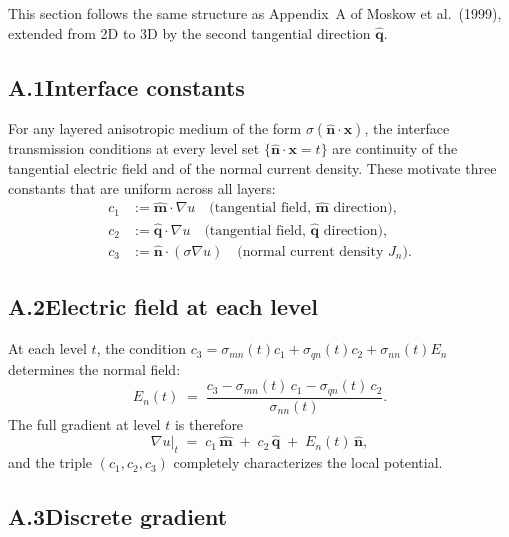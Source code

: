 \documentclass[11pt]{article}
\newcommand{\nn}{\hat{\bm{n}}}
\newcommand{\mm}{\hat{\bm{m}}}
\newcommand{\qq}{\hat{\bm{q}}}
\begin{document}
This section follows the same structure as Appendix~A of Moskow et al.\
(1999), extended from 2D to 3D by the second tangential direction $\qq$.

\subsection*{A.1\quad Interface constants}

For any layered anisotropic medium of the form $\sigma(\nn\cdot\bm{x})$,
the interface transmission conditions at every level set $\{\nn\cdot\bm{x}=t\}$
are continuity of the tangential electric field and of the normal current density.
These motivate three constants that are uniform across all layers:
\begin{align}
  c_1 &:= \mm\cdot\nabla u \quad \text{(tangential field, $\mm$ direction)},
  \label{eq:A1}\\
  c_2 &:= \qq\cdot\nabla u \quad \text{(tangential field, $\qq$ direction)},
  \label{eq:A2}\\
  c_3 &:= \nn\cdot(\sigma\nabla u) \quad \text{(normal current density $J_n$)}.
  \label{eq:A3}
\end{align}

\subsection*{A.2\quad Electric field at each level}

At each level $t$, the condition $c_3 = \sigma_{mn}(t)c_1 + \sigma_{qn}(t)c_2
+ \sigma_{nn}(t)E_n$ determines the normal field:
\begin{equation}\label{eq:A4}
  E_n(t) \;=\; \frac{c_3 - \sigma_{mn}(t)\,c_1 - \sigma_{qn}(t)\,c_2}{\sigma_{nn}(t)}.
\end{equation}
The full gradient at level $t$ is therefore
\begin{equation}\label{eq:A5}
  \nabla u\big|_{t}
  \;=\; c_1\,\mm \;+\; c_2\,\qq \;+\; E_n(t)\,\nn,
\end{equation}
and the triple $(c_1,c_2,c_3)$ completely characterizes the local potential.

\subsection*{A.3\quad Discrete gradient}
\end{document}
